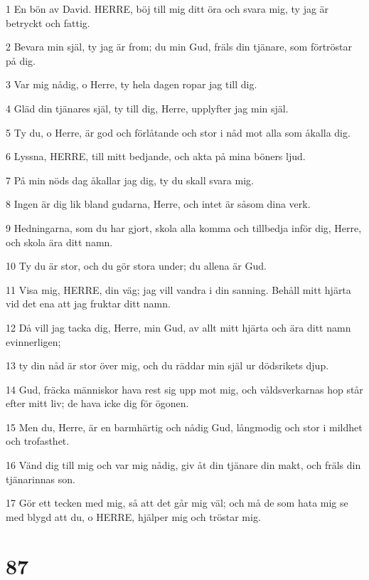 \par 1 En bön av David. HERRE, böj till mig ditt öra och svara mig, ty jag är betryckt och fattig.
\par 2 Bevara min själ, ty jag är from; du min Gud, fräls din tjänare, som förtröstar på dig.
\par 3 Var mig nådig, o Herre, ty hela dagen ropar jag till dig.
\par 4 Gläd din tjänares själ, ty till dig, Herre, upplyfter jag min själ.
\par 5 Ty du, o Herre, är god och förlåtande och stor i nåd mot alla som åkalla dig.
\par 6 Lyssna, HERRE, till mitt bedjande, och akta på mina böners ljud.
\par 7 På min nöds dag åkallar jag dig, ty du skall svara mig.
\par 8 Ingen är dig lik bland gudarna, Herre, och intet är såsom dina verk.
\par 9 Hedningarna, som du har gjort, skola alla komma och tillbedja inför dig, Herre, och skola ära ditt namn.
\par 10 Ty du är stor, och du gör stora under; du allena är Gud.
\par 11 Visa mig, HERRE, din väg; jag vill vandra i din sanning. Behåll mitt hjärta vid det ena att jag fruktar ditt namn.
\par 12 Då vill jag tacka dig, Herre, min Gud, av allt mitt hjärta och ära ditt namn evinnerligen;
\par 13 ty din nåd är stor över mig, och du räddar min själ ur dödsrikets djup.
\par 14 Gud, fräcka människor hava rest sig upp mot mig, och våldsverkarnas hop står efter mitt liv; de hava icke dig för ögonen.
\par 15 Men du, Herre, är en barmhärtig och nådig Gud, långmodig och stor i mildhet och trofasthet.
\par 16 Vänd dig till mig och var mig nådig, giv åt din tjänare din makt, och fräls din tjänarinnas son.
\par 17 Gör ett tecken med mig, så att det går mig väl; och må de som hata mig se med blygd att du, o HERRE, hjälper mig och tröstar mig.

\chapter{87}

